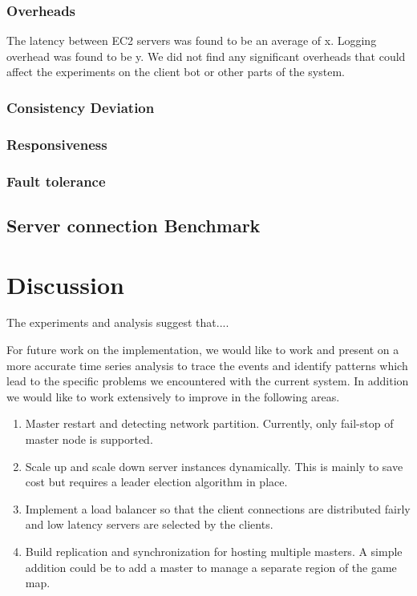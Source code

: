 \documentclass[a4paper]{IEEEtran}
\begin{document}
  \subsubsection{Overheads}

  The latency between EC2 servers was found to be an average of x. Logging overhead was found to be y. We did not find any significant overheads that could affect the experiments on the client bot or other parts of the system.
  
  \subsubsection{Consistency Deviation}
  
  \subsubsection{Responsiveness}
  
  \subsubsection{Fault tolerance}

  \subsection{Server connection Benchmark}
  
  \section{Discussion}
  
  \label{sec:discussion}
  
  The experiments and analysis suggest that....
  
  For future work on the implementation, we would like to work and present on a more accurate time
  series analysis to trace the events and identify patterns which lead to the specific problems
  we encountered with the current system. In addition we would like to work extensively to improve in the following areas.
  
  \begin{enumerate}
    \item Master restart and detecting network partition. Currently, only fail-stop of master node is supported.
    \item Scale up and scale down server instances dynamically. This is mainly to save cost but requires a leader election algorithm in place.
    \item Implement a load balancer so that the client connections are distributed fairly and low latency servers are selected by the clients. 
    \item Build replication and synchronization for hosting multiple masters. A simple addition could be to add a master to manage a separate region of the game map.
  \end{enumerate}
  
\end{document}
